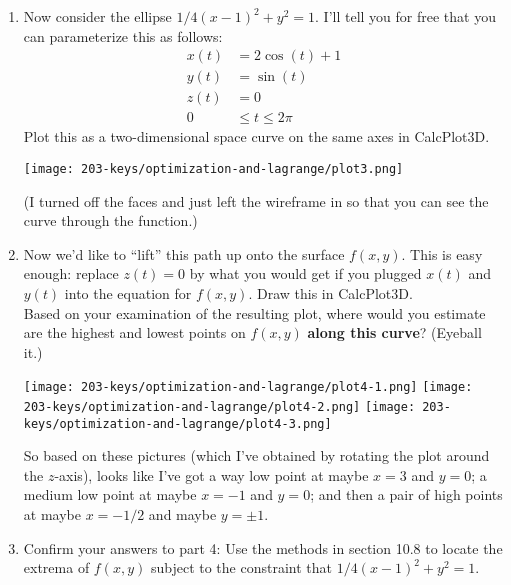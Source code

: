 \documentclass[10pt]{article}
\newenvironment{red}{\color{red}}{\ignorespacesafterend}
\begin{document}
\begin{enumerate}[leftmargin=0pt]
    \item Now consider the ellipse $1/4 (x-1)^2 + y^2 = 1$. I'll tell you for free that you can parameterize this as follows:
    \begin{align*}
        x(t) &= 2 \cos(t) + 1\\
        y(t) &= \sin(t) \\
        z(t) &= 0 \\
        0 &\leq t \leq 2\pi
    \end{align*}
    Plot this as a two-dimensional space curve on the same axes in CalcPlot3D.
    \begin{center}
        \texttt{[image: 203-keys/optimization-and-lagrange/plot3.png]}
    \end{center}
    \begin{red}
    (I turned off the faces and just left the wireframe in so that you can see the curve through the function.)
    \end{red}
    
    \item Now we'd like to ``lift'' this path up onto the surface $f(x, y)$. This is easy enough: replace $z(t) = 0$ by what you would get if you plugged $x(t)$ and $y(t)$ into the equation for $f(x, y)$. Draw this in CalcPlot3D. \\
    Based on your examination of the resulting plot, where would you estimate are the highest and lowest points on $f(x, y)$ \textbf{along this curve}? (Eyeball it.)
    
    \begin{center}
\texttt{[image: 203-keys/optimization-and-lagrange/plot4-1.png]}
\texttt{[image: 203-keys/optimization-and-lagrange/plot4-2.png]}
\texttt{[image: 203-keys/optimization-and-lagrange/plot4-3.png]}
    \end{center}
    
    \begin{red}
    So based on these pictures (which I've obtained by rotating the plot around the $z$-axis), looks like I've got a way low point at maybe $x=3$ and $y=0$; a medium low point at maybe $x=-1$ and $y=0$; and then a pair of high points at maybe $x=-1/2$ and maybe $y=\pm 1$.
    \end{red}
    
    \item Confirm your answers to part 4: Use the methods in section 10.8 to locate the extrema of $f(x, y)$ subject to the constraint that $1/4 (x-1)^2 + y^2 = 1$.
    

\end{enumerate}
\end{document}
